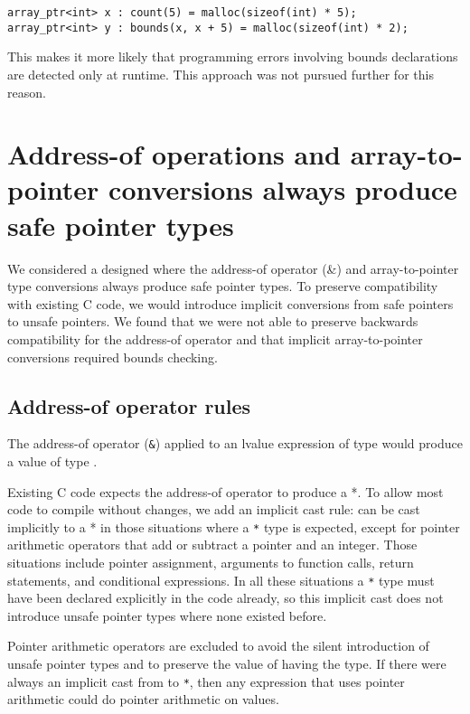 \begin{verbatim}
array_ptr<int> x : count(5) = malloc(sizeof(int) * 5);
array_ptr<int> y : bounds(x, x + 5) = malloc(sizeof(int) * 2);
\end{verbatim}

This makes it more likely that programming errors involving bounds
declarations are detected only at runtime.  This approach was not 
pursued further for this reason.

\section{Address-of operations and array-to-pointer conversions always produce safe pointer types}

We considered a designed where the address-of operator (\&) and
array-to-pointer type conversions always produce safe pointer types. To
preserve compatibility with existing C code, we would introduce implicit
conversions from safe pointers to unsafe pointers. We found that we were
not able to preserve backwards compatibility for the address-of operator
and that implicit array-to-pointer conversions required bounds checking.

\subsection{Address-of operator rules}

The address-of operator (\texttt{\&}) applied to an lvalue expression of
type  would produce a value of type
\ptrT.

Existing C code expects the address-of operator to produce a  *.
To allow most code to compile without changes, we add an implicit cast
rule: \ptrT can be cast
implicitly to a  * in those situations where a 
\texttt{*} type is expected, except for pointer arithmetic operators
that add or subtract a pointer and an integer. Those situations include
pointer assignment, arguments to function calls, return statements, and
conditional expressions. In all these situations a  \texttt{*}
type must have been declared explicitly in the code already, so this
implicit cast does not introduce unsafe pointer types where none existed
before.

Pointer arithmetic operators are excluded to avoid the silent
introduction of unsafe pointer types and to preserve the value of having
the \ptrT type. If
there were always an implicit cast from \ptrT to  \texttt{*},
then any expression that uses pointer arithmetic could do pointer
arithmetic on \ptrT
values.


